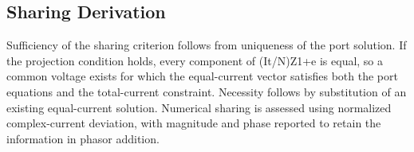 \documentclass[11pt]{article}
\begin{document}
\subsection*{Sharing Derivation}
\hypertarget{A.sharing_derivation.heading}{}
Sufficiency of the sharing criterion follows from uniqueness of the port solution. If the projection condition holds, every component of (It/N)Z1+e is equal, so a common voltage exists for which the equal-current vector satisfies both the port equations and the total-current constraint. Necessity follows by substitution of an existing equal-current solution. Numerical sharing is assessed using normalized complex-current deviation, with magnitude and phase reported to retain the information in phasor addition.
\end{document}
